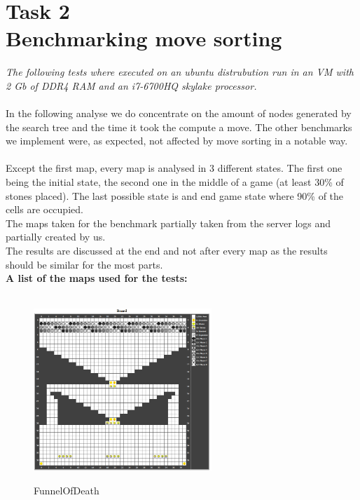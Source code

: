 \section{Task 2 \\ Benchmarking move sorting}
\color{gray}
\textit{The following tests where executed on an ubuntu distrubution run in an VM with 2 Gb of DDR4 RAM and an i7-6700HQ skylake processor.}\\\\
\color{black}
In the following analyse we do concentrate on the amount of nodes generated by the search tree and the time it took the compute a move. The other benchmarks we implement were, as expected, not affected by move sorting in a notable way.\\\\
Except the first map, every map is analysed in 3 different states. The first one being the initial state, the second one in the middle of a game (at least 30\% of stones placed). The last possible state is and end game state where 90\% of the cells are occupied.\\
The maps taken for the benchmark partially taken from the server logs and partially created by us.\\
The results are discussed at the end and not after every map as the results should be similar for the most parts.\\
\newpage
\textbf{A list of the maps used for the tests:}\\\\
\begin{figure}[!hp]
	\centering
	\includegraphics[width=0.6\textwidth,keepaspectratio]{FunnelOfDeath.png}\\
	\caption{FunnelOfDeath}
\end{figure}

